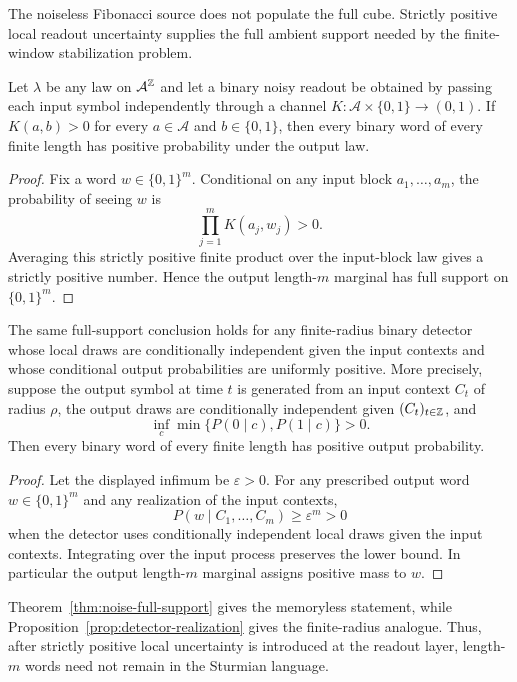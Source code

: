 The noiseless Fibonacci source does not populate the full cube. Strictly positive local readout uncertainty supplies the full ambient support needed by the finite-window stabilization problem.

\begin{theorem}\label{thm:noise-full-support}
Let $\lambda$ be any law on $\mathcal A^{\mathbb{Z}}$ and let a binary noisy readout
be obtained by passing each input symbol independently through a channel
$K:\mathcal A\times\{0,1\}\to(0,1)$.  If
$K(a,b)>0$ for every $a\in\mathcal A$ and $b\in\{0,1\}$, then every binary
word of every finite length has positive probability under the output law.
\end{theorem}

\begin{proof}
Fix a word $w\in\{0,1\}^m$.  Conditional on any input block
$a_1,\ldots,a_m$, the probability of seeing $w$ is
\[
  \prod_{j=1}^m K(a_j,w_j)>0.
\]
Averaging this strictly positive finite product over the input-block law gives
a strictly positive number.  Hence the output length-$m$ marginal has full
support on $\{0,1\}^m$.
\end{proof}

\begin{proposition}\label{prop:detector-realization}
The same full-support conclusion holds for any finite-radius binary detector
whose local draws are conditionally independent given the input contexts and
whose conditional output probabilities are uniformly positive.  More
precisely, suppose the output symbol at time $t$ is generated from an input
context $C_t$ of radius $\rho$, the output draws are conditionally independent
given $(C_t)_{t\in\mathbb{Z}}$, and
\[
  \inf_{c}\min\{P(0\mid c),P(1\mid c)\}>0 .
\]
Then every binary word of every finite length has positive output probability.
\end{proposition}

\begin{proof}
Let the displayed infimum be $\varepsilon>0$.  For any prescribed output word
$w\in\{0,1\}^m$ and any realization of the input contexts,
\[
P(w\mid C_1,\ldots,C_m)\ge \varepsilon^m>0
\]
when the detector uses conditionally independent local draws given the input
contexts.  Integrating over the input process preserves the lower bound.  In
particular the output length-$m$ marginal assigns positive mass to $w$.
\end{proof}
\begin{remark}
Theorem~\ref{thm:noise-full-support} gives the memoryless statement, while Proposition~\ref{prop:detector-realization} gives the finite-radius analogue. Thus, after strictly positive local uncertainty is introduced at the readout layer, length-$m$ words need not remain in the Sturmian language.
\end{remark}

